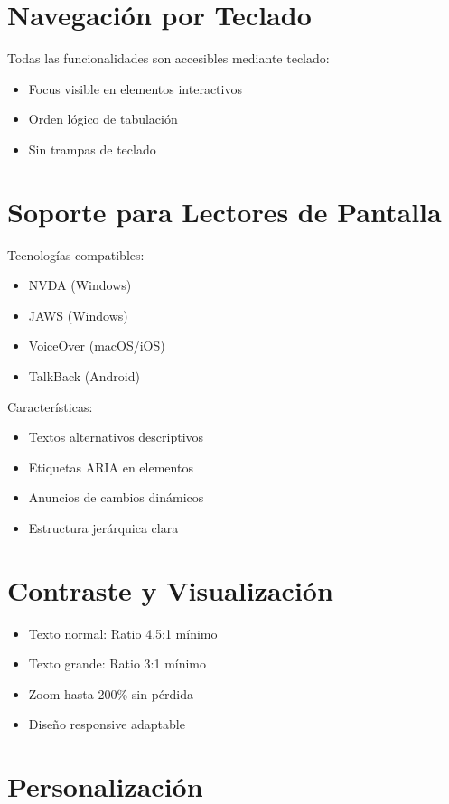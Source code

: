 \documentclass[11pt,a4paper,twoside]{book}
\begin{document}
\section{Navegación por Teclado}

Todas las funcionalidades son accesibles mediante teclado:
\begin{itemize}
    \item Focus visible en elementos interactivos
    \item Orden lógico de tabulación
    \item Sin trampas de teclado
\end{itemize}

\section{Soporte para Lectores de Pantalla}

Tecnologías compatibles:
\begin{itemize}
    \item NVDA (Windows)
    \item JAWS (Windows)
    \item VoiceOver (macOS/iOS)
    \item TalkBack (Android)
\end{itemize}

Características:
\begin{itemize}
    \item Textos alternativos descriptivos
    \item Etiquetas ARIA en elementos
    \item Anuncios de cambios dinámicos
    \item Estructura jerárquica clara
\end{itemize}

\section{Contraste y Visualización}

\begin{itemize}
    \item Texto normal: Ratio 4.5:1 mínimo
    \item Texto grande: Ratio 3:1 mínimo
    \item Zoom hasta 200\% sin pérdida
    \item Diseño responsive adaptable
\end{itemize}

\section{Personalización}
\end{document}
